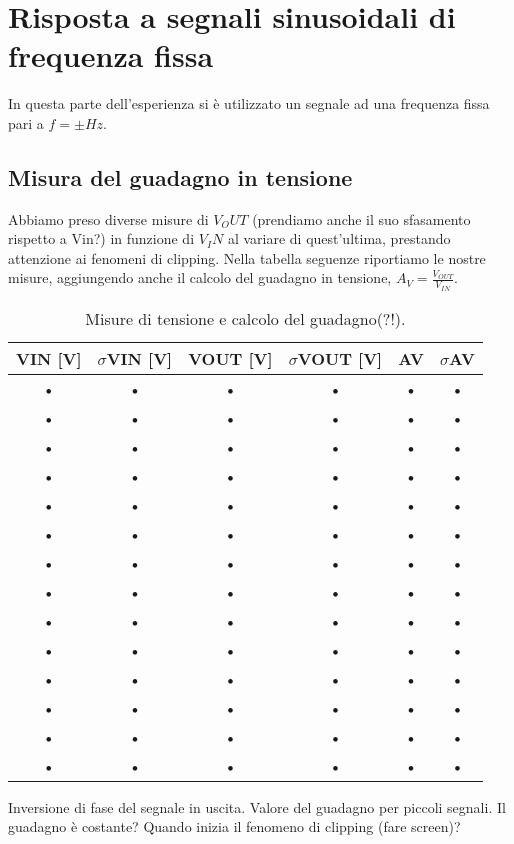 \documentclass[10pt,a4paper]{article}
\begin{document}
\section{Risposta a segnali sinusoidali di frequenza fissa}
In questa parte dell'esperienza si è utilizzato un segnale ad una frequenza fissa pari a $f= \pm Hz$.

\subsection{Misura del guadagno in tensione}
Abbiamo preso diverse misure di $V_OUT$ (prendiamo anche il suo sfasamento rispetto a Vin?) in funzione di $V_IN$ al variare di quest'ultima, prestando attenzione ai fenomeni di clipping. Nella tabella seguenze riportiamo le nostre misure, aggiungendo anche il calcolo del guadagno in tensione, $A_V=\frac{V_{OUT}}{V_{IN}}$.

\begin{table}[h]
\centering
\begin{tabular}{|c|c|c|c|c|c|}
\hline 
VIN [V] & $\sigma$VIN [V]& VOUT [V]& $\sigma$VOUT [V]& AV & $\sigma$AV \\ 
\hline 
• & • & • & • & • & • \\ 
\hline 
• & • & • & • & • & • \\ 
\hline 
• & • & • & • & • & • \\ 
\hline 
• & • & • & • & • & • \\ 
\hline 
• & • & • & • & • & • \\ 
\hline 
• & • & • & • & • & • \\ 
\hline 
• & • & • & • & • & • \\ 
\hline 
• & • & • & • & • & • \\ 
\hline 
• & • & • & • & • & • \\ 
\hline 
• & • & • & • & • & • \\ 
\hline 
• & • & • & • & • & • \\ 
\hline 
• & • & • & • & • & • \\ 
\hline 
• & • & • & • & • & • \\ 
\hline 
• & • & • & • & • & • \\ 
\hline 
\end{tabular}
\caption{Misure di tensione e calcolo del guadagno(?!).}
\end{table}
Inversione di fase del segnale in uscita. Valore del guadagno per piccoli segnali. Il guadagno è costante? Quando inizia il fenomeno di clipping (fare screen)?
\end{document}
